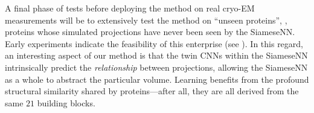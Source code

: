 A final phase of tests before deploying the method on real cryo-EM measurements will be to extensively test the method on ``unseen proteins'', \ie, proteins whose simulated projections have never been seen by the SiameseNN\@.
Early experiments indicate the feasibility of this enterprise (see ).
In this regard, an interesting aspect of our method is that the twin CNNs within the SiameseNN intrinsically predict the \textit{relationship} between projections, allowing the SiameseNN as a whole to abstract the particular volume.
Learning benefits from the profound structural similarity shared by proteins---after all, they are all derived from the same $21$ building blocks.

